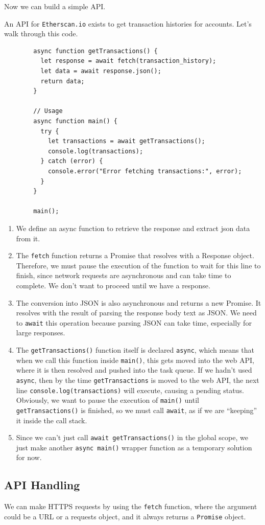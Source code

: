 \documentclass{article}
\begin{document}
    Now we can build a simple API. 

    \begin{example}
      An API for \texttt{Etherscan.io} exists to get transaction histories for accounts. Let's walk through this code. 
      \begin{lstlisting}
        async function getTransactions() {
          let response = await fetch(transaction_history);
          let data = await response.json(); 
          return data;
        }

        // Usage
        async function main() {
          try {
            let transactions = await getTransactions();
            console.log(transactions);
          } catch (error) {
            console.error("Error fetching transactions:", error);
          }
        }

        main();
      \end{lstlisting}
      \begin{enumerate}
        \item We define an async function to retrieve the response and extract json data from it. 
        \item The \texttt{fetch} function returns a Promise that resolves with a Response object. Therefore, we must pause the execution of the function to wait for this line to finish, since network requests are asynchronous and can take time to complete. We don't want to proceed until we have a response. 
        \item The conversion into JSON is also asynchronous and returns a new Promise. It resolves with the result of parsing the response body text as JSON. We need to \texttt{await} this operation because parsing JSON can take time, especially for large responses. 
        \item The \texttt{getTransactions()} function itself is declared \texttt{async}, which means that when we call this function inside \texttt{main()}, this gets moved into the web API, where it is then resolved and pushed into the task queue. If we hadn't used \texttt{async}, then by the time \texttt{getTransactions} is moved to the web API, the next line \texttt{console.log(transactions)} will execute, causing a pending status. Obviously, we want to pause the execution of \texttt{main()} until \texttt{getTransactions()} is finished, so we must call \texttt{await}, as if we are ``keeping'' it inside the call stack. 

        \item Since we can't just call \texttt{await getTransactions()} in the global scope, we just make another \texttt{async main()} wrapper function as a temporary solution for now. 
      \end{enumerate}
    \end{example}

  \subsection{API Handling} 

    We can make HTTPS requests by using the \texttt{fetch} function, where the argument could be a URL or a requests object, and it always returns a \texttt{Promise} object. 
\end{document}
